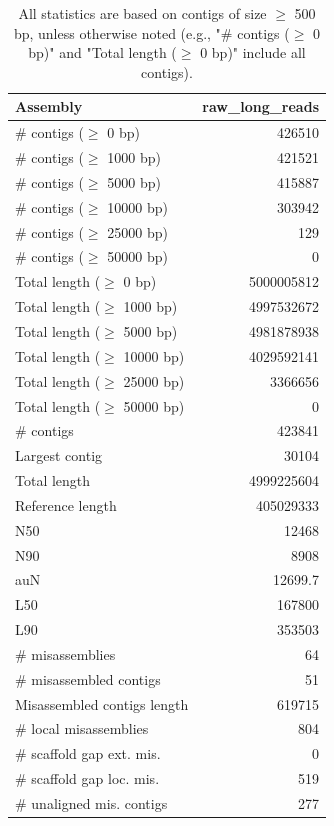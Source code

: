 \documentclass[12pt,a4paper]{article}
\begin{document}
\begin{table}[ht]
\begin{center}
\caption{All statistics are based on contigs of size $\geq$ 500 bp, unless otherwise noted (e.g., "\# contigs ($\geq$ 0 bp)" and "Total length ($\geq$ 0 bp)" include all contigs).}
\begin{tabular}{|l*{1}{|r}|}
\hline
Assembly & raw\_long\_reads \\ \hline
\# contigs ($\geq$ 0 bp) & 426510 \\ \hline
\# contigs ($\geq$ 1000 bp) & 421521 \\ \hline
\# contigs ($\geq$ 5000 bp) & 415887 \\ \hline
\# contigs ($\geq$ 10000 bp) & 303942 \\ \hline
\# contigs ($\geq$ 25000 bp) & 129 \\ \hline
\# contigs ($\geq$ 50000 bp) & 0 \\ \hline
Total length ($\geq$ 0 bp) & 5000005812 \\ \hline
Total length ($\geq$ 1000 bp) & 4997532672 \\ \hline
Total length ($\geq$ 5000 bp) & 4981878938 \\ \hline
Total length ($\geq$ 10000 bp) & 4029592141 \\ \hline
Total length ($\geq$ 25000 bp) & 3366656 \\ \hline
Total length ($\geq$ 50000 bp) & 0 \\ \hline
\# contigs & 423841 \\ \hline
Largest contig & 30104 \\ \hline
Total length & 4999225604 \\ \hline
Reference length & 405029333 \\ \hline
N50 & 12468 \\ \hline
N90 & 8908 \\ \hline
auN & 12699.7 \\ \hline
L50 & 167800 \\ \hline
L90 & 353503 \\ \hline
\# misassemblies & 64 \\ \hline
\# misassembled contigs & 51 \\ \hline
Misassembled contigs length & 619715 \\ \hline
\# local misassemblies & 804 \\ \hline
\# scaffold gap ext. mis. & 0 \\ \hline
\# scaffold gap loc. mis. & 519 \\ \hline
\# unaligned mis. contigs & 277 \\ \hline

\end{tabular}
\end{center}
\end{table}
\end{document}
